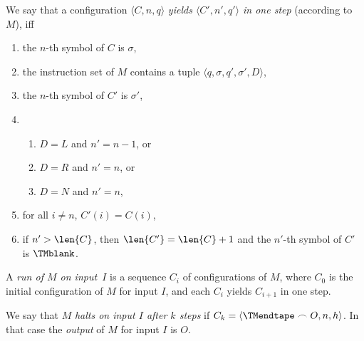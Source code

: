 \documentclass[../../../include/open-logic-section]{subfiles}
\begin{document}
\begin{defn}
We say that a configuration $\langle C, n, q\rangle$ \emph{yields
  $\langle C', n', q'\rangle$ in one step} (according to $M$), iff
\begin{enumerate}
\item the $n$-th symbol of $C$ is $\sigma$,
\item the instruction set of $M$ contains a tuple $\langle q, \sigma,
  q', \sigma', D\rangle$,
\item the $n$-th symbol of $C'$ is $\sigma'$,
\item
\begin{enumerate}
\item $D = L$ and $n' = n -1$, or
\item $D = R$ and $n' = n$, or
\item $D = N$ and $n' = n$,
\end{enumerate}
\item for all $i \neq n$, $C'(i) = C(i)$,
\item if $n' > \len{C}$, then $\len{C'} = \len{C} + 1$ and the $n'$-th
  symbol of $C'$ is $\TMblank$.
\end{enumerate}
\end{defn}

\begin{defn}
A \emph{run of $M$ on input~$I$} is a sequence $C_i$ of configurations
of $M$, where $C_0$ is the initial configuration of $M$ for input $I$,
and each $C_i$ yields $C_{i+1}$ in one step.

We say that $M$ \emph{halts on input $I$ after $k$ steps} if $C_k =
\langle \TMendtape \frown O, n, h\rangle$.  In that case the
\emph{output} of $M$ for input $I$ is $O$.
\end{defn}
\end{document}
